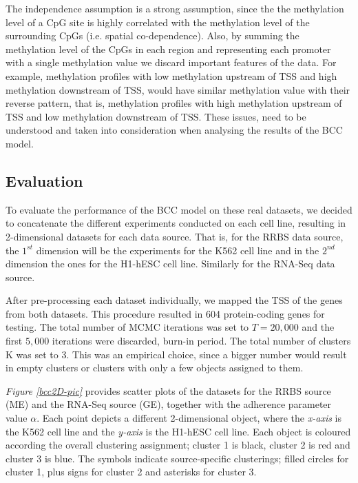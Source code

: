 The independence assumption is a strong assumption, since the the methylation level of a CpG site is highly correlated with the methylation level of the surrounding CpGs (i.e. spatial co-dependence). Also, by summing the methylation level of the CpGs in each region and representing each promoter with a single methylation value we discard  important features of the data. For example, methylation profiles with low methylation upstream of TSS and high methylation downstream of TSS, would have similar methylation value with their reverse pattern, that is, methylation profiles with high methylation upstream of TSS and low methylation downstream of TSS. These issues, need to be understood and taken into consideration when analysing the results of the BCC model.

\subsection{Evaluation}
To evaluate the performance of the BCC model on these real datasets, we decided to concatenate the different experiments conducted on each cell line, resulting in 2-dimensional datasets for each data source. That is, for the RRBS data source, the $1^{st}$ dimension will be the experiments for the K562 cell line and in the $2^{nd}$ dimension the ones for the H1-hESC cell line. Similarly for the RNA-Seq data source.

After pre-processing each dataset individually, we mapped the TSS of the genes from both datasets. This procedure resulted in 604 protein-coding genes for testing. The total number of MCMC iterations was set to $T=20,000$ and the first $5,000$ iterations were discarded, \ie burn-in period. The total number of clusters K was set to 3. This was an empirical choice, since a bigger number would result in empty clusters or clusters with only a few objects assigned to them. 

\emph{Figure \ref{bcc2D-pic}} provides scatter plots of the datasets for the RRBS source (ME) and the RNA-Seq source (GE), together with the adherence parameter value $\alpha$. Each point depicts a different 2-dimensional object, where the \emph{x-axis} is the K562 cell line and the \emph{y-axis} is the H1-hESC cell line. Each object is coloured according the overall clustering assignment; cluster 1 is black, cluster 2 is red and cluster 3 is blue. The symbols indicate source-specific clusterings; filled circles for cluster 1, plus signs for cluster 2 and asterisks for cluster 3. 

